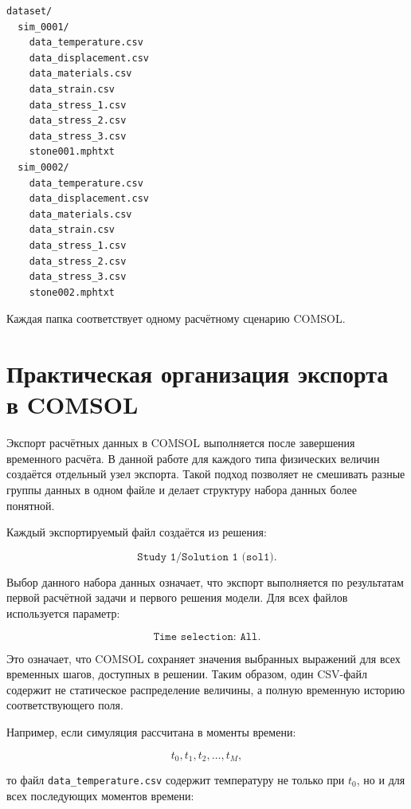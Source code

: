 \begin{verbatim}
dataset/
  sim_0001/
    data_temperature.csv
    data_displacement.csv
    data_materials.csv
    data_strain.csv
    data_stress_1.csv
    data_stress_2.csv
    data_stress_3.csv
    stone001.mphtxt
  sim_0002/
    data_temperature.csv
    data_displacement.csv
    data_materials.csv
    data_strain.csv
    data_stress_1.csv
    data_stress_2.csv
    data_stress_3.csv
    stone002.mphtxt
\end{verbatim}

Каждая папка соответствует одному расчётному сценарию COMSOL.

\section{Практическая организация экспорта в COMSOL}

Экспорт расчётных данных в COMSOL выполняется после завершения временного расчёта. В данной работе для каждого типа физических величин создаётся отдельный узел экспорта. Такой подход позволяет не смешивать разные группы данных в одном файле и делает структуру набора данных более понятной.

Каждый экспортируемый файл создаётся из решения:

\begin{equation}
\texttt{Study 1/Solution 1 (sol1)}.
\end{equation}

Выбор данного набора данных означает, что экспорт выполняется по результатам первой расчётной задачи и первого решения модели. Для всех файлов используется параметр:

\begin{equation}
\texttt{Time selection: All}.
\end{equation}

Это означает, что COMSOL сохраняет значения выбранных выражений для всех временных шагов, доступных в решении. Таким образом, один CSV-файл содержит не статическое распределение величины, а полную временную историю соответствующего поля.

Например, если симуляция рассчитана в моменты времени:

\begin{equation}
t_0,t_1,t_2,\ldots,t_M,
\end{equation}

то файл \texttt{data\_temperature.csv} содержит температуру не только при $t_0$, но и для всех последующих моментов времени:

